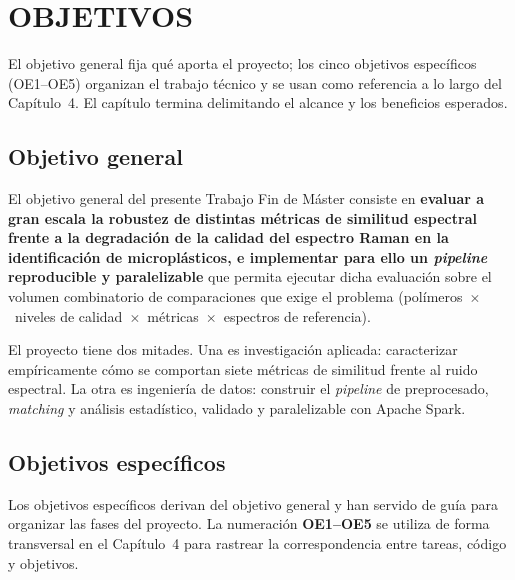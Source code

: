 \chapter{OBJETIVOS}

El objetivo general fija qué aporta el proyecto; los cinco objetivos específicos (OE1--OE5) organizan el trabajo técnico y se usan como referencia a lo largo del Capítulo~4. El capítulo termina delimitando el alcance y los beneficios esperados.

\section{Objetivo general}

El objetivo general del presente Trabajo Fin de Máster consiste en \textbf{evaluar a gran escala la robustez de distintas métricas de similitud espectral frente a la degradación de la calidad del espectro Raman en la identificación de microplásticos, e implementar para ello un \textit{pipeline} reproducible y paralelizable} que permita ejecutar dicha evaluación sobre el volumen combinatorio de comparaciones que exige el problema (polímeros~$\times$~niveles de calidad~$\times$~métricas~$\times$~espectros de referencia).

El proyecto tiene dos mitades. Una es investigación aplicada: caracterizar empíricamente cómo se comportan siete métricas de similitud frente al ruido espectral. La otra es ingeniería de datos: construir el \textit{pipeline} de preprocesado, \textit{matching} y análisis estadístico, validado y paralelizable con Apache Spark.

\section{Objetivos específicos}

Los objetivos específicos derivan del objetivo general y han servido de guía para organizar las fases del proyecto. La numeración \textbf{OE1--OE5} se utiliza de forma transversal en el Capítulo~4 para rastrear la correspondencia entre tareas, código y objetivos.

